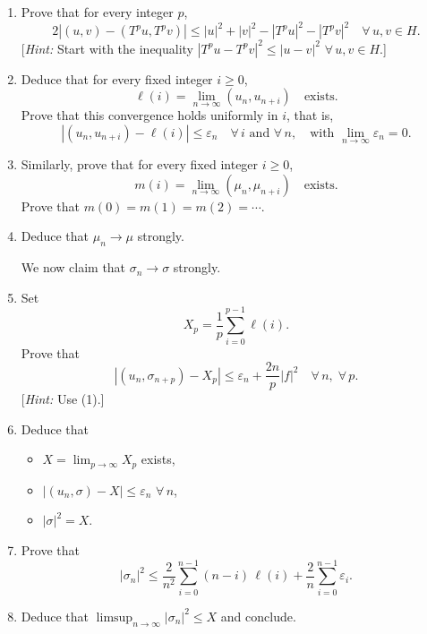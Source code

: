 \documentclass[12pt]{article}
\newcommand{\abs}[1]{\left|#1\right|}
\begin{document}
\begin{enumerate}
\item Prove that for every integer $p$,
\[
2\abs{(u,v) - (T^p u, T^p v)} \le \abs{u}^2 + \abs{v}^2 - \abs{T^p u}^2 - \abs{T^p v}^2
\quad \forall\, u, v \in H.
\]
[\textit{Hint:} Start with the inequality $\abs{T^p u - T^p v}^2 \le \abs{u-v}^2$ $\forall\, u, v \in H$.]
 
\item Deduce that for every fixed integer $i \ge 0$,
\[
\ell(i) = \lim_{n\to\infty}(u_n, u_{n+i}) \quad \text{exists.}
\]
Prove that this convergence holds uniformly in $i$, that is,
\begin{equation}\tag{1}
\abs{(u_n, u_{n+i}) - \ell(i)} \le \varepsilon_n \quad \forall\, i \text{ and } \forall\, n,
\quad \text{with } \lim_{n\to\infty} \varepsilon_n = 0.
\end{equation}
 
\item Similarly, prove that for every fixed integer $i \ge 0$,
\[
m(i) = \lim_{n\to\infty}(\mu_n, \mu_{n+i}) \quad \text{exists.}
\]
Prove that $m(0) = m(1) = m(2) = \cdots$.
 
 
\item Deduce that $\mu_n \to \mu$ strongly.
 
We now claim that $\sigma_n \to \sigma$ strongly.
 
\item Set
\[
X_p = \frac{1}{p}\sum_{i=0}^{p-1} \ell(i).
\]
Prove that
\[
\abs{(u_n, \sigma_{n+p}) - X_p} \le \varepsilon_n + \frac{2n}{p}\abs{f}^2 \quad \forall\, n,\; \forall\, p.
\]
[\textit{Hint:} Use (1).]
 
\item Deduce that
\begin{itemize}
    \item[(i)] $X = \lim_{p\to\infty} X_p$ exists,
    \item[(ii)] $\abs{(u_n, \sigma) - X} \le \varepsilon_n$ $\forall\, n$,
    \item[(iii)] $\abs{\sigma}^2 = X$.
\end{itemize}
 
\item Prove that
\[
\abs{\sigma_n}^2 \le \frac{2}{n^2}\sum_{i=0}^{n-1}(n-i)\,\ell(i) + \frac{2}{n}\sum_{i=0}^{n-1}\varepsilon_i.
\]
 
\item Deduce that $\limsup_{n\to\infty}\abs{\sigma_n}^2 \le X$ and conclude.
\end{enumerate}
 
\end{document}
